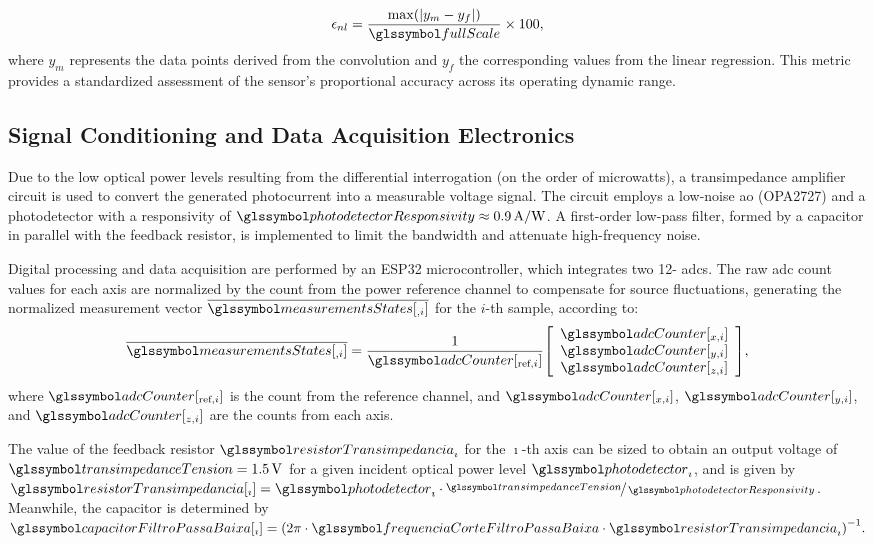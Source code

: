 \documentclass[sensors,article,accept,pdftex,moreauthors]{Definitions/mdpi}
\begin{document}
\begin{equation}
	\epsilon_{nl} = \frac{\max(|y_m - y_f|)}{\fullScale} \times 100,
	\label{eq:non_linearity}
\end{equation}
where $y_m$ represents the data points derived from the convolution and $y_f$ the corresponding values from the linear regression. This metric provides a standardized assessment of the sensor's proportional accuracy across its operating dynamic range.

\subsection{Signal Conditioning and Data Acquisition Electronics\label{subsection:sinalConditining}}

Due to the low optical power levels resulting from the differential interrogation (on the order of microwatts), a transimpedance amplifier circuit is used to convert the generated photocurrent into a measurable voltage signal. The circuit employs a low-noise \gls{ao} (OPA2727) and a photodetector with a responsivity of $\photodetectorResponsivity \approx \SI{0.9}{\ampere\per\watt}$. A first-order low-pass filter, formed by a capacitor in parallel with the feedback resistor, is implemented to limit the bandwidth and attenuate high-frequency noise.

Digital processing and data acquisition are performed by an ESP32 microcontroller, which integrates two 12-\si{\bit} \glspl{adc}. The raw \gls{adc} count values for each axis are normalized by the count from the power reference channel to compensate for source fluctuations, generating the normalized measurement vector $\overline{\measurementsStates[{}_{,i}]}$ for the $i$-th sample, according to:
\begin{equation}
	\overline{\measurementsStates[{}_{,i}]}=\frac{1}{\adcCounter[{_{\text{ref},i}}]}\left[\begin{array}{c}
			\adcCounter[{_{x,i}}] \\
			\adcCounter[{_{y,i}}] \\
			\adcCounter[{_{z,i}}]
		\end{array}\right],
	\label{eq:-14-1}
\end{equation}
where $\adcCounter[{_{\text{ref},i}}]$ is the count from the reference channel, and $\adcCounter[{_{x,i}}]$, $\adcCounter[{_{y,i}}]$, and $\adcCounter[{_{z,i}}]$ {are} the counts from each axis.

The value of the feedback resistor $\resistorTransimpedancia_{\imath}$ for the $\imath$-th axis can be sized to obtain an output voltage of $\transimpedanceTension=\SI{1.5}{\volt}$ for a given incident optical power level $\photodetector_{\imath}$, and is given by	$\resistorTransimpedancia[{_{\imath}}]=\photodetector_{\imath}\cdot\nicefrac{\transimpedanceTension}{\,\photodetectorResponsivity}$. Meanwhile, the capacitor is determined by $\capacitorFiltroPassaBaixa[{}_{ \imath}]=\left({2\pi\cdot\frequenciaCorteFiltroPassaBaixa\cdot\resistorTransimpedancia_{\imath}}\right)^{-1}.$
\end{document}
